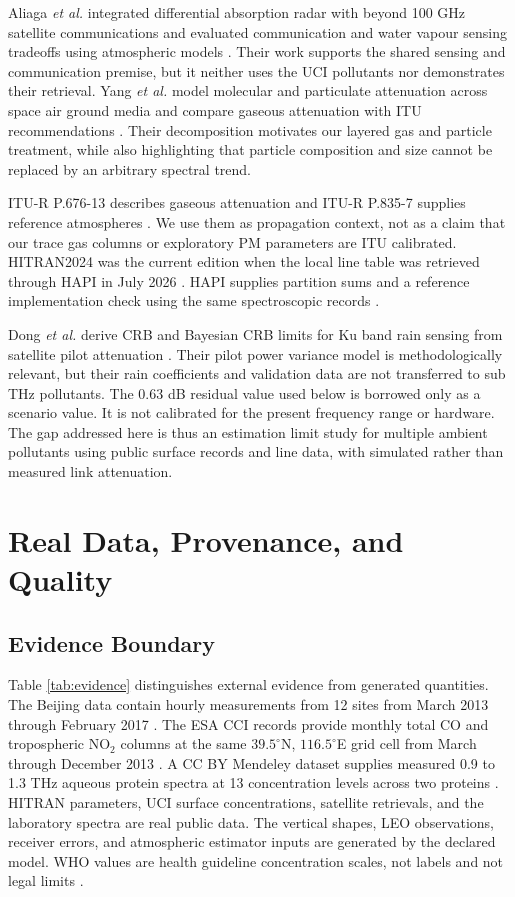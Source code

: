 \documentclass[conference]{IEEEtran}
\begin{document}
Aliaga \emph{et al.} integrated differential absorption radar with beyond 100 GHz satellite communications and evaluated communication and water vapour sensing tradeoffs using atmospheric models \cite{aliaga2024dar}. Their work supports the shared sensing and communication premise, but it neither uses the UCI pollutants nor demonstrates their retrieval. Yang \emph{et al.} model molecular and particulate attenuation across space air ground media and compare gaseous attenuation with ITU recommendations \cite{yang2024attenuation}. Their decomposition motivates our layered gas and particle treatment, while also highlighting that particle composition and size cannot be replaced by an arbitrary spectral trend.

ITU-R P.676-13 describes gaseous attenuation and ITU-R P.835-7 supplies reference atmospheres \cite{itu676,itu835}. We use them as propagation context, not as a claim that our trace gas columns or exploratory PM parameters are ITU calibrated. HITRAN2024 was the current edition when the local line table was retrieved through HAPI in July 2026 \cite{gordon2026hitran}. HAPI supplies partition sums and a reference implementation check using the same spectroscopic records \cite{kochanov2016hapi}.

Dong \emph{et al.} derive CRB and Bayesian CRB limits for Ku band rain sensing from satellite pilot attenuation \cite{dong2026rain}. Their pilot power variance model is methodologically relevant, but their rain coefficients and validation data are not transferred to sub THz pollutants. The 0.63 dB residual value used below is borrowed only as a scenario value. It is not calibrated for the present frequency range or hardware. The gap addressed here is thus an estimation limit study for multiple ambient pollutants using public surface records and line data, with simulated rather than measured link attenuation.

\section{Real Data, Provenance, and Quality}

\subsection{Evidence Boundary}

Table \ref{tab:evidence} distinguishes external evidence from generated quantities. The Beijing data contain hourly measurements from 12 sites from March 2013 through February 2017 \cite{chen2017beijing}. The ESA CCI records provide monthly total CO and tropospheric NO$_2$ columns at the same $39.5^\circ$N, $116.5^\circ$E grid cell from March through December 2013 \cite{esacciCO,esacciNO2}. A CC BY Mendeley dataset supplies measured 0.9 to 1.3 THz aqueous protein spectra at 13 concentration levels across two proteins \cite{hattori2024data}. HITRAN parameters, UCI surface concentrations, satellite retrievals, and the laboratory spectra are real public data. The vertical shapes, LEO observations, receiver errors, and atmospheric estimator inputs are generated by the declared model. WHO values are health guideline concentration scales, not labels and not legal limits \cite{who2021aqg}.
\end{document}
